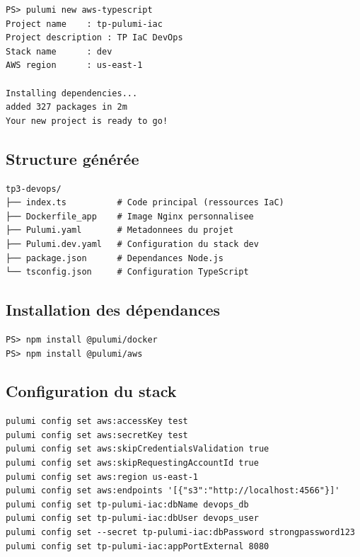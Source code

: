 \documentclass[12pt,a4paper]{article}
\begin{document}
\begin{lstlisting}[style=termStyle, caption=Initialisation avec pulumi new]
PS> pulumi new aws-typescript
Project name    : tp-pulumi-iac
Project description : TP IaC DevOps
Stack name      : dev
AWS region      : us-east-1

Installing dependencies...
added 327 packages in 2m
Your new project is ready to go!
\end{lstlisting}

\subsection{Structure générée}

\begin{lstlisting}[style=termStyle, caption=Structure du projet Pulumi]
tp3-devops/
├── index.ts          # Code principal (ressources IaC)
├── Dockerfile_app    # Image Nginx personnalisee
├── Pulumi.yaml       # Metadonnees du projet
├── Pulumi.dev.yaml   # Configuration du stack dev
├── package.json      # Dependances Node.js
└── tsconfig.json     # Configuration TypeScript
\end{lstlisting}

\subsection{Installation des dépendances}

\begin{lstlisting}[style=termStyle, caption=Installation des packages Pulumi]
PS> npm install @pulumi/docker
PS> npm install @pulumi/aws
\end{lstlisting}

\subsection{Configuration du stack}

\begin{lstlisting}[style=termStyle, caption=Configuration des variables]
pulumi config set aws:accessKey test
pulumi config set aws:secretKey test
pulumi config set aws:skipCredentialsValidation true
pulumi config set aws:skipRequestingAccountId true
pulumi config set aws:region us-east-1
pulumi config set aws:endpoints '[{"s3":"http://localhost:4566"}]'
pulumi config set tp-pulumi-iac:dbName devops_db
pulumi config set tp-pulumi-iac:dbUser devops_user
pulumi config set --secret tp-pulumi-iac:dbPassword strongpassword123
pulumi config set tp-pulumi-iac:appPortExternal 8080
\end{lstlisting}
\end{document}

